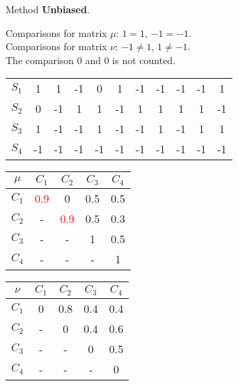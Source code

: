 \documentclass{beamer}
\begin{document}
\begin{frame}
Method \textbf{Unbiased}.

\bigskip
Comparisons for matrix $\mu$: $1=1$, $-1=-1$.\\
Comparisons for matrix $\nu$: $-1\neq1$, $1\neq-1$.\\
The comparison $0$ and $0$ is not counted.

\begin{center}
\begin{tabular}{c|cccccccccc}
& & & & & & & & & & \\
\hline $S_1$ & 1 & 1 & -1 & 0 & 1 & -1 & -1 & -1 & -1 & 1 \\
$S_2$ & 0 & -1 & 1 & 1 & -1 & 1 & 1 & 1 & 1 & -1 \\
$S_3$ & 1 & -1 & -1 & 1 & -1 & -1 & 1 & -1 & 1 & 1 \\
$S_4$ & -1 & -1 & -1 & -1 & -1 & -1 & -1 & -1 & -1 & -1
\end{tabular}
\end{center}

\begin{center}
\begin{minipage}[b]{0.4\linewidth}
\begin{tabular}{c|cccc}
$\mu$ & $C_1$ & $C_2$ & $C_3$ & $C_4$ \\
\hline $C_1$ & \textcolor{red}{0.9} & 0 & 0.5 & 0.5 \\
$C_2$ & - & \textcolor{red}{0.9} & 0.5 & 0.3 \\
$C_3$ & - & - & 1 & 0.5 \\
$C_4$ & - & - & - & 1
\end{tabular}
\end{minipage}
\begin{minipage}[b]{0.4\linewidth}
\begin{tabular}{c|cccc}
$\nu$ & $C_1$ & $C_2$ & $C_3$ & $C_4$ \\
\hline $C_1$ & 0 & 0.8 & 0.4 & 0.4 \\
$C_2$ & - & 0 & 0.4 & 0.6 \\
$C_3$ & - & - & 0 & 0.5 \\
$C_4$ & - & - & - & 0
\end{tabular}
\end{minipage}
\end{center}
\end{frame}
\end{document}
